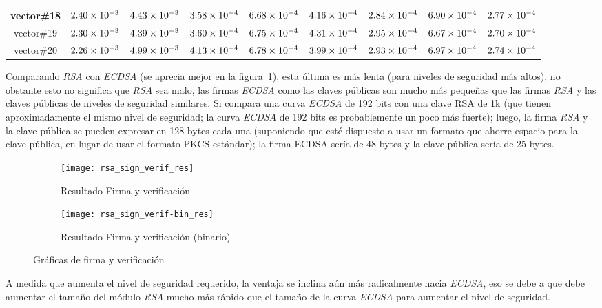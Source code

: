\documentclass[../main.tex]{subfiles}
\begin{document}
\begin{table}[ht]
\begin{tabular}{|c|c|c|c|c|c|c|c|c|}
    \rowcolor[HTML]{C0C0C0}
    vector\#18 & $\num{2.40E-03}$ & $\num{4.43E-03}$ & $\num{3.58E-04}$ & $\num{6.68E-04}$ & $\num{4.16E-04}$ & $\num{2.84E-04}$ & $\num{6.90E-04}$ & $\num{2.77E-04}$ \\ \hline
    vector\#19 & $\num{2.30E-03}$ & $\num{4.39E-03}$ & $\num{3.60E-04}$ & $\num{6.75E-04}$ & $\num{4.31E-04}$ & $\num{2.95E-04}$ & $\num{6.67E-04}$ & $\num{2.70E-04}$ \\ \hline
    \rowcolor[HTML]{C0C0C0}
    vector\#20 & $\num{2.26E-03}$ & $\num{4.99E-03}$ & $\num{4.13E-04}$ & $\num{6.78E-04}$ & $\num{3.99E-04}$ & $\num{2.93E-04}$ & $\num{6.97E-04}$ & $\num{2.74E-04}$ \\ \hline
  \end{tabular}
\end{table}

Comparando \textit{RSA} con \textit{ECDSA} (se aprecia mejor en la figura~\ref{fig:fyv}),
esta última es más lenta (para niveles de seguridad más altos), no obstante esto no
significa que \textit{RSA} sea malo, las firmas \textit{ECDSA} como las claves públicas
son mucho más pequeñas que las firmas \textit{RSA} y las claves públicas de niveles de
seguridad similares. Si compara una curva \textit{ECDSA} de 192 bits con una clave RSA de
1k (que tienen aproximadamente el mismo nivel de seguridad; la curva \textit{ECDSA} de
192 bits es probablemente un poco más fuerte); luego, la firma \textit{RSA} y la clave
pública se pueden expresar en 128 bytes cada una (suponiendo que esté dispuesto a usar un
formato que ahorre espacio para la clave pública, en lugar de usar el formato PKCS
estándar); la firma ECDSA sería de 48 bytes y la clave pública sería de 25 bytes.
\begin{figure}[ht]\centering

\begin{subfigure}[b]{0.5\textwidth}
  \centering
  \texttt{[image: rsa\_sign\_verif\_res]}
  \caption{Resultado Firma y verificación}\label{fig:fyv}
\end{subfigure}
\hfill{}
\begin{subfigure}[b]{0.45\textwidth}
  \centering
  \texttt{[image: rsa\_sign\_verif-bin\_res]}
  \caption{Resultado Firma y verificación (binario)}\label{fig:fyvbin}
\end{subfigure}
\caption{Gráficas de firma y verificación}\label{fig:fv}
\end{figure}

A medida que aumenta el nivel de seguridad requerido, la ventaja se inclina aún más
radicalmente hacia \textit{ECDSA}, eso se debe a que debe aumentar el tamaño del módulo
\textit{RSA} mucho más rápido que el tamaño de la curva \textit{ECDSA} para aumentar el
nivel de seguridad.
\end{document}
